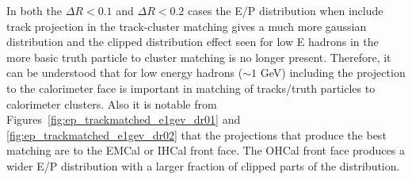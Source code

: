 In both the $\Delta R < 0.1$ and $\Delta R < 0.2$ cases the E/P distribution when include track projection in the track-cluster matching gives a much more gaussian distribution and the clipped distribution effect seen for low E hadrons in the more basic truth particle to cluster matching is no longer present. 
Therefore, it can be understood that for low energy hadrons ($\sim 1$ GeV) including the projection to the calorimeter face is important in matching of tracks/truth particles to calorimeter clusters.
Also it is notable from Figures~\ref{fig:ep_trackmatched_e1gev_dr01} and \ref{fig:ep_trackmatched_e1gev_dr02} that the projections that produce the best matching are to the EMCal or IHCal front face. The OHCal front face produces a wider E/P distribution with a larger fraction of clipped parts of the distribution.
